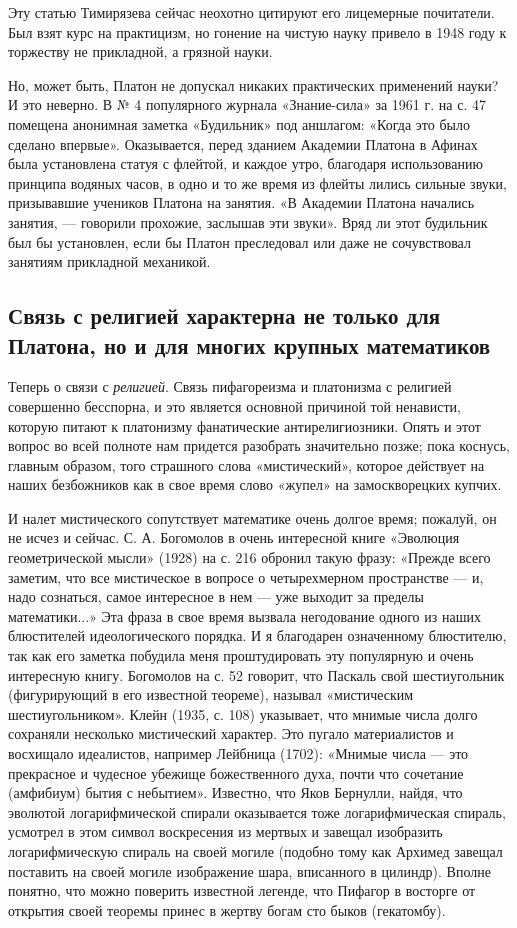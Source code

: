 Эту статью Тимирязева сейчас неохотно цитируют его лицемерные
почитатели. Был взят курс на практицизм, но гонение на чистую науку
привело в 1948 году к торжеству не прикладной, а грязной науки.

Но, может быть, Платон не допускал никаких практических применений
науки? И это неверно. В № 4 популярного журнала «Знание-сила» за 1961
г. на с. 47 помещена анонимная заметка «Будильник» под аншлагом:
«Когда это было сделано впервые». Оказывается, перед зданием Академии
Платона в Афинах была установлена статуя с флейтой, и каждое утро,
благодаря использованию принципа водяных часов, в одно и то же время
из флейты лились сильные звуки, призывавшие учеников Платона на
занятия. «В Академии Платона начались занятия, --- говорили прохожие,
заслышав эти звуки». Вряд ли этот будильник был бы установлен, если бы
Платон преследовал или даже не сочувствовал занятиям прикладной
механикой.

\subsection{Связь с религией характерна не только для Платона, но и
для многих крупных математиков}

Теперь о связи с \emph{религией}. Связь пифагореизма и платонизма с
религией совершенно бесспорна, и это является основной причиной той
ненависти, которую питают к платонизму фанатические антирелигиозники.
Опять и этот вопрос во всей полноте нам придется разобрать значительно
позже; пока коснусь, главным образом, того страшного слова
«мистический», которое действует на наших безбожников как в свое время
слово «жупел» на замоскворецких купчих.

И налет мистического сопутствует математике очень долгое время;
пожалуй, он не исчез и сейчас. С. А. Богомолов в очень интересной
книге «Эволюция геометрической мысли» (1928) на с. 216 обронил такую
фразу: «Прежде всего заметим, что все мистическое в вопросе о
четырехмерном пространстве --- и, надо сознаться, самое интересное в
нем --- уже выходит за пределы математики...» Эта фраза в свое время
вызвала негодование одного из наших блюстителей идеологического
порядка. И я благодарен означенному блюстителю, так как его заметка
побудила меня проштудировать эту популярную и очень интересную книгу.
Богомолов на с. 52 говорит, что Паскаль свой шестиугольник
(фигурирующий в его известной теореме), называл «мистическим
шестиугольником». Клейн (1935, с. 108) указывает, что мнимые числа
долго сохраняли несколько мистический характер. Это пугало
материалистов и восхищало идеалистов, например Лейбница (1702):
«Мнимые числа --- это прекрасное и чудесное убежище божественного
духа, почти что сочетание (амфибиум) бытия с небытием». Известно, что
Яков Бернулли, найдя, что эволютой логарифмической спирали оказывается
тоже логарифмическая спираль, усмотрел в этом символ воскресения из
мертвых и завещал изобразить логарифмическую спираль на своей могиле
(подобно тому как Архимед завещал поставить на своей могиле
изображение шара, вписанного в цилиндр). Вполне понятно, что можно
поверить известной легенде, что Пифагор в восторге от открытия своей
теоремы принес в жертву богам сто быков (гекатомбу).

